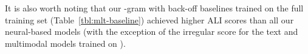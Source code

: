 \documentclass[twocolumn]{svjour3}          \smartqed  \usepackage{graphicx}
\begin{document}
It is also worth noting that our -gram with back-off baselines trained on the full training set (Table~\ref{tbl:mlt-baseline}) achieved higher ALI scores than all our neural-based models (with the exception of the irregular score for the text and multimodal models trained on ).


\begin{comment}
\begin{table}[t]
    \caption{ALI scores for the lexical translation task on the test set, comparing the scores of an MFT baseline, text-only, image-only, and multimodal models. We present the results across models trained on different subsets of the data. \textcolor{red}{THE "ALL" VERSION}}
    \label{tbl:mlt-ali-all}
    \centering
\begin{tabular}{l c c c c c}
    \toprule
    & & \textbf{MFT} & \textbf{text} & \textbf{image} & \textbf{multimodal} \\
    \midrule
\multirow{5}{*}{ES} &  & 0.54 & 0.93 & \hl{0.02} & 0.93\\
 &  & 0.59 & 0.96 & \hl{0.02} & 0.96\\
 &  & 0.64 & 0.96 & \hl{0.02} & 0.96\\
 &  & 0.40 & 0.93 & 0.47 & 0.92\\
\midrule
\multirow{5}{*}{PT} &  & 0.53 & 0.91 & \hl{0.01} & 0.91\\
 &  & 0.60 & 0.96 & \hl{0.01} & 0.96\\
 &  & 0.56 & 0.95 & \hl{0.01} & 0.95\\
 &  & 0.36 & 0.94 & 0.45 & 0.94\\
\midrule
\multirow{5}{*}{FR} &  & 0.59 & 0.88 & \hl{0.00} & 0.88\\
 &  & 0.73 & 0.93 & \hl{0.00} & 0.94\\
 &  & 0.76 & 0.96 & \hl{-0.00} & 0.95\\
 &  & 0.31 & 0.91 & 0.46 & 0.91\\
\midrule
\multirow{5}{*}{DE} &  & 0.43 & 0.89 & \hl{0.07} & 0.91\\
 &  & 0.43 & 0.93 & \hl{0.07} & 0.92\\
 &  & 0.60 & 0.95 & \hl{0.07} & 0.96\\
 &  & 0.27 & 0.98 & 0.53 & 0.98\\
\bottomrule
    \end{tabular}


\end{table}
\end{comment}
\end{document}
